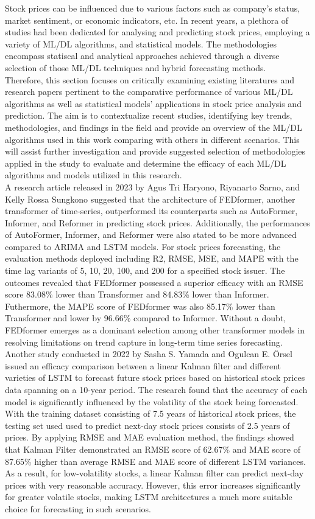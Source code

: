 \documentclass[conference]{IEEEtran}
\begin{document}
Stock prices can be influenced due to various factors such as company’s status, market sentiment, or economic indicators, etc. In recent years, a plethora of studies had been dedicated for analysing and predicting stock prices, employing a variety of ML/DL algorithms, and statistical models. The methodologies encompass statiscal and analytical approaches achieved through a diverse selection of those ML/DL techniques and hybrid forecasting methods.\\ 
Therefore, this section focuses on critically examining existing literatures and research papers pertinent to the comparative performance of various ML/DL algorithms as well as statistical models’ applications in stock price analysis and prediction. The aim is to contextualize recent studies, identifying key trends, methodologies, and findings in the field and provide an overview of the ML/DL algorithms used in this work comparing with others in different scenarios. This will assist further investigation and provide suggested selection of methodologies applied in the study to evaluate and determine the efficacy of each ML/DL algorithms and models utilized in this research.\\
A research article released in 2023 by Agus Tri Haryono, Riyanarto Sarno, and Kelly Rossa Sungkono suggested that the architecture of FEDformer, another transformer of time-series, outperformed its counterparts such as AutoFormer, Informer, and Reformer in predicting stock prices. Additionally, the performances of AutoFormer, Informer, and Reformer were also stated to be more advanced compared to ARIMA and LSTM models. For stock prices forecasting, the evaluation methods deployed including R2, RMSE, MSE, and MAPE with the time lag variants of 5, 10, 20, 100, and 200 for a specified stock issuer. The outcomes revealed that FEDformer possessed a superior efficacy with an RMSE score 83.08\% lower than Transformer and 84.83\% lower than Informer. Futhermore, the MAPE score of FEDformer was also 85.17\% lower than Transformer and lower by 96.66\% compared to Informer. Without a doubt, FEDformer emerges as a dominant selection among other transformer models in resolving limitations on trend capture in long-term time series forecasting.
Another study conducted in 2022 by Sasha S. Yamada and Ogulcan E. Örsel issued an efficacy comparison between a linear Kalman filter and different varieties of LSTM to forecast future stock prices based on historical stock prices data spanning on a 10-year period. The research found that the accuracy of each model is significantly influenced by the volatility of the stock being forecasted. With the training dataset consisting of 7.5 years of historical stock prices, the testing set used used to predict next-day stock prices consists of 2.5 years of prices. By applying RMSE and MAE evaluation method, the findings showed that Kalman Filter demonstrated an RMSE score of 62.67\% and MAE score of 87.65\% higher than average RMSE and MAE score of different LSTM variances. As a result, for low-volatility stocks, a linear Kalman filter can predict next-day prices with very reasonable accuracy. However, this error increases significantly for greater volatile stocks, making LSTM architectures a much more suitable choice for forecasting in such scenarios.\\
\end{document}
